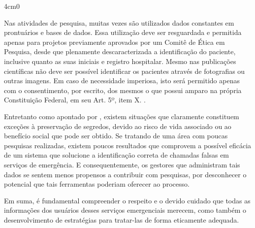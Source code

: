 \renewenvironment{quote}[1][1em]
  {\begin{adjustwidth}{#1}{0}}
  {\end{adjustwidth}}
\begin{quote}[4cm]
\begin{singlespace}
{\footnotesize  
Nas atividades de pesquisa, muitas vezes são utilizados dados constantes em prontuários e bases de dados. Essa utilização deve ser resguardada e permitida apenas para projetos previamente aprovados por um Comitê de Ética em Pesquisa, desde que plenamente descaracterizada a identificação do paciente, inclusive quanto as suas iniciais e registro hospitalar. Mesmo nas publicações científicas não deve ser possível identificar os pacientes através de fotografias ou outras imagens. Em caso de necessidade imperiosa, isto será permitido apenas com o consentimento, por escrito, dos mesmos o que possui amparo na própria Constituição Federal, em seu Art. 5º, item X. \citep{francisconi1998aspectos}.
}
\end{singlespace}
\end{quote}

Entretanto como apontado por \cite{francisconi1998aspectos}, existem situações que claramente constituem exceções à preservação de segredos, devido ao risco de vida associado ou ao benefício social que pode ser obtido. Se tratando de uma área com poucas pesquisas realizadas, existem poucos resultados que comprovem a possível eficácia de um sistema que solucione a identificação correta de chamadas falsas em serviços de emergência. E consequentemente, os gestores que administram tais dados se sentem menos propensos a contribuir com pesquisas, por desconhecer o potencial que tais ferramentas poderiam oferecer ao processo.

Em suma, é fundamental compreender o respeito e o devido cuidado que todas as informações dos usuários desses serviços emergenciais merecem, como também o desenvolvimento de estratégias para tratar-las de forma eticamente adequada.